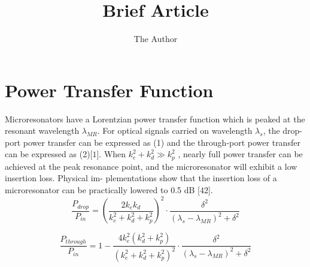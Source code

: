 \documentclass[12pt]{article}
\title{Brief Article}
\author{The Author}
\date{}                                           %
\begin{document}
\maketitle

\section{Power Transfer Function}
	Microresonators have a Lorentzian power transfer function which is peaked at the resonant wavelength $\lambda _{MR}$. For optical signals carried on wavelength $\lambda_{s}$, the drop-port power transfer can be expressed as (1) and the through-port power transfer can be expressed as (2)[$1$]. When   $k_{e}^{2} + k_{d}^{2} \gg k_{p}^2$ , nearly full power transfer can be achieved at the peak resonance point, and the microresonator will exhibit a low insertion loss. Physical im- plementations show that the insertion loss of a microresonator can be practically lowered to 0.5 dB [$42$]. 
\begin{equation}
\label{drop-port power transfer} 
\frac{P_{drop}}{P_{in}}=\left ( \frac{2k_{e}k_{d}}{k_{e}^2 + k_{d}^2 + k_{p}^2} \right )^2 \cdot \frac{\delta ^2}{\left ( \lambda _{s} -  \lambda _{MR}\right )^2 + \delta ^2}
\end{equation}

\begin{equation}
\label{through-port power transfer} 
\frac{P_{through}}{P_{in}}=1-  \frac{4k_{e}^2(k_{d}^2+k_{p}^2)}{\left ( k_{e}^2 + k_{d}^2 + k_{p}^2 \right )^2} \cdot \frac{\delta ^2}{\left ( \lambda _{s} -  \lambda _{MR}\right )^2 + \delta ^2}
\end{equation}

\subsection{}




\end{document}
